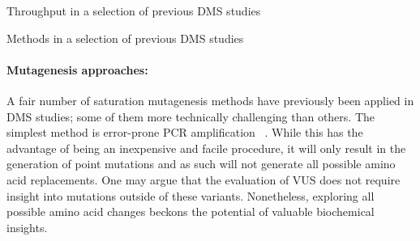 \begin{landscape}
\begin{table}
	\centering
	\caption{Throughput in a selection of previous DMS studies}
	\label{table:DMSstudiesTP}
	
\end{table}

\begin{table}
	\centering
	\caption{Methods in a selection of previous DMS studies}
	\label{table:DMSstudiesMethods}
	
\end{table}
\end{landscape}






\paragraph{Mutagenesis approaches:} A fair number of saturation mutagenesis methods have previously been applied in DMS studies; some of them more technically challenging than others. The simplest method is error-prone PCR amplification~\cite{mohan_pcr_2011} . While this has the advantage of being an inexpensive and facile procedure, it will only result in the generation of point mutations and as such will not generate all possible amino acid replacements. One may argue that the evaluation of VUS does not require insight into mutations outside of these variants. Nonetheless, exploring all possible amino acid changes beckons the potential of valuable biochemical insights. 

